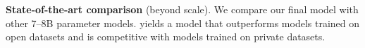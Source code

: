 \begin{table}[h]
\centering
\caption{\textbf{State-of-the-art comparison} (beyond \xltrack{} scale). We compare our final model with other 7--8B parameter models. \hqpool yields a model that outperforms models trained on open datasets
and is competitive with models trained on private datasets.}
\label{table:pre-main-results}

%
\end{table}